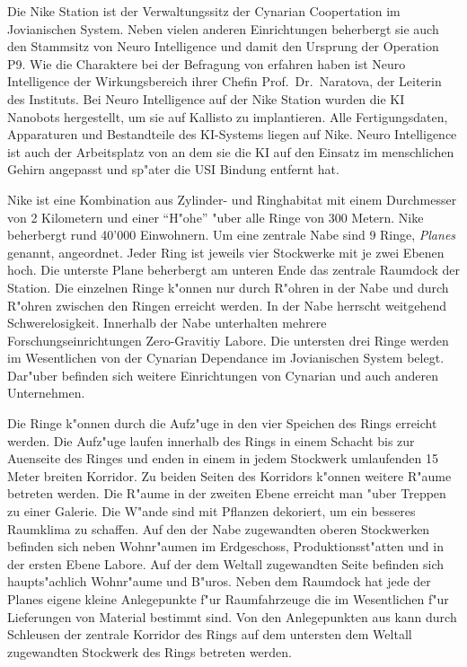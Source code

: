 
Die Nike Station ist der Verwaltungssitz der Cynarian Coopertation im Jovianischen System. Neben vielen anderen Einrichtungen beherbergt sie auch den Stammsitz von Neuro Intelligence und damit den Ursprung der Operation P9. Wie die Charaktere bei der Befragung von \ml{} erfahren haben ist Neuro Intelligence der Wirkungsbereich ihrer Chefin Prof.~Dr.~Naratova, der Leiterin des Instituts. Bei Neuro Intelligence auf der Nike Station wurden die KI Nanobots hergestellt, um sie auf Kallisto zu implantieren. Alle Fertigungsdaten, Apparaturen und Bestandteile des KI-Systems liegen auf Nike. Neuro Intelligence ist auch der Arbeitsplatz von \ml{} an dem sie die KI auf den Einsatz im menschlichen Gehirn angepasst und sp"ater die USI Bindung entfernt hat.

Nike ist eine Kombination aus Zylinder- und Ringhabitat mit einem Durchmesser von 2 Kilometern und einer "`H"ohe"' "uber alle Ringe von 300 Metern. Nike beherbergt rund 40'000 Einwohnern. Um eine zentrale Nabe sind 9 Ringe, \emph{Planes} genannt, angeordnet. Jeder Ring ist jeweils vier Stockwerke mit je zwei Ebenen hoch. Die unterste Plane beherbergt am unteren Ende das zentrale Raumdock der Station.  Die einzelnen Ringe k"onnen nur durch R"ohren in der Nabe und durch R"ohren zwischen den Ringen erreicht werden. In der Nabe herrscht weitgehend Schwerelosigkeit. Innerhalb der Nabe unterhalten mehrere Forschungseinrichtungen Zero-Gravitiy Labore. Die untersten drei Ringe werden im Wesentlichen von der Cynarian Dependance im Jovianischen System belegt. Dar"uber befinden sich weitere Einrichtungen von Cynarian und auch anderen Unternehmen.

Die Ringe k"onnen durch die Aufz"uge in den vier Speichen des Rings erreicht werden. Die Aufz"uge laufen innerhalb des Rings in einem Schacht bis zur Au\3enseite des Ringes und enden in einem in jedem Stockwerk umlaufenden 15 Meter breiten Korridor. Zu beiden Seiten des Korridors k"onnen weitere R"aume betreten werden. Die R"aume in der zweiten Ebene erreicht man "uber Treppen zu einer Galerie. Die W"ande sind mit Pflanzen dekoriert, um ein besseres Raumklima zu schaffen. Auf den der Nabe zugewandten oberen Stockwerken befinden sich neben Wohnr"aumen im Erdgeschoss, Produktionsst"atten und in der ersten Ebene Labore. Auf der dem Weltall zugewandten Seite befinden sich haupts"achlich Wohnr"aume und B"uros. Neben dem Raumdock hat jede der Planes eigene kleine Anlegepunkte f"ur Raumfahrzeuge die im Wesentlichen f"ur Lieferungen von Material bestimmt sind. Von den Anlegepunkten aus kann durch Schleusen der zentrale Korridor des Rings auf dem untersten dem Weltall zugewandten Stockwerk des Rings betreten werden.

